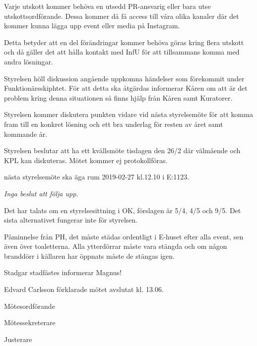 \documentclass[10pt]{article}
\def\mo{Edvard Carlsson}
\def\ms{Sonja Kenari}
\def\ji{Saga Åslund}
\begin{document}
\begin{paragrafer}
Varje utskott kommer behöva en utsedd PR-ansvarig eller bara utse utskottsordförande. Dessa kommer då få access till våra olika kanaler där det kommer kunna lägga upp event eller media på Instagram. 

Detta betyder att en del förändringar kommer behöva göras kring flera utskott och då gäller det att hålla kontakt med InfU för att tillsammans komma med andra lösningar.


Styrelsen höll diskussion angående uppkomna händelser som förekommit under Funktionärsskiphtet. För att detta ska åtgärdas informerar Kåren om att är det problem kring denna situationen så finns hjälp från Kåren samt Kuratorer. 

Styrelsen kommer diskutera punkten vidare vid nästa styrelsemöte för att komma fram till en konkret lösning och ett bra underlag för resten av året samt kommande år.

Styrelsen beslutar att ha ett kvällsmöte tisdagen den 26/2 där välmående och KPL kan diskuteras. Mötet kommer ej protokollföras.

\Mba nästa styrelsemöte ska äga rum 2019-02-27 kl.12.10 i E:1123.

\textit{Inga beslut att följa upp.}


Det har talats om en styrelsesittning i OK, förslagen är 5/4, 4/5 och 9/5. Det sista alternativet fungerar inte för styrelsen. 


Påminnelse från PH, det måste städas ordentligt i E-huset efter alla event, sen även över toaletterna. Alla ytterdörrar måste vara stängda och om någon branddörr i källaren har öppnats måste de stängas igen. 

Stadgar stadfästes informerar Magnus!

{\mo} förklarade mötet avslutat kl. 13.06.
\end{paragrafer}

\hidesignfoot
\begin{signatures}{3}
\signature{\mo}{Mötesordförande}
\signature{\ms}{Mötessekreterare}
\signature{\ji}{Justerare}
\end{signatures}
\end{document}
